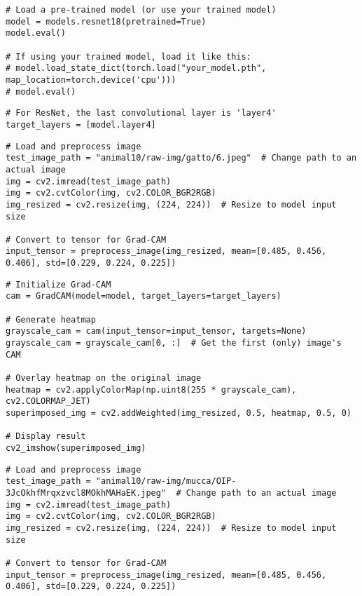 \documentclass{article}
\begin{document}
\begin{verbatim}
# Load a pre-trained model (or use your trained model)
model = models.resnet18(pretrained=True)
model.eval()

# If using your trained model, load it like this:
# model.load_state_dict(torch.load("your_model.pth", map_location=torch.device('cpu')))
# model.eval()

\end{verbatim}

\begin{verbatim}
# For ResNet, the last convolutional layer is 'layer4'
target_layers = [model.layer4]

\end{verbatim}

\begin{verbatim}
# Load and preprocess image
test_image_path = "animal10/raw-img/gatto/6.jpeg"  # Change path to an actual image
img = cv2.imread(test_image_path)
img = cv2.cvtColor(img, cv2.COLOR_BGR2RGB)
img_resized = cv2.resize(img, (224, 224))  # Resize to model input size

# Convert to tensor for Grad-CAM
input_tensor = preprocess_image(img_resized, mean=[0.485, 0.456, 0.406], std=[0.229, 0.224, 0.225])
\end{verbatim}

\begin{verbatim}
# Initialize Grad-CAM
cam = GradCAM(model=model, target_layers=target_layers)

# Generate heatmap
grayscale_cam = cam(input_tensor=input_tensor, targets=None)
grayscale_cam = grayscale_cam[0, :]  # Get the first (only) image's CAM

# Overlay heatmap on the original image
heatmap = cv2.applyColorMap(np.uint8(255 * grayscale_cam), cv2.COLORMAP_JET)
superimposed_img = cv2.addWeighted(img_resized, 0.5, heatmap, 0.5, 0)

# Display result
cv2_imshow(superimposed_img)

\end{verbatim}

\begin{verbatim}
# Load and preprocess image
test_image_path = "animal10/raw-img/mucca/OIP-3JcOkhfMrqxzvcl8MOkhMAHaEK.jpeg"  # Change path to an actual image
img = cv2.imread(test_image_path)
img = cv2.cvtColor(img, cv2.COLOR_BGR2RGB)
img_resized = cv2.resize(img, (224, 224))  # Resize to model input size

# Convert to tensor for Grad-CAM
input_tensor = preprocess_image(img_resized, mean=[0.485, 0.456, 0.406], std=[0.229, 0.224, 0.225])
\end{verbatim}
\end{document}
